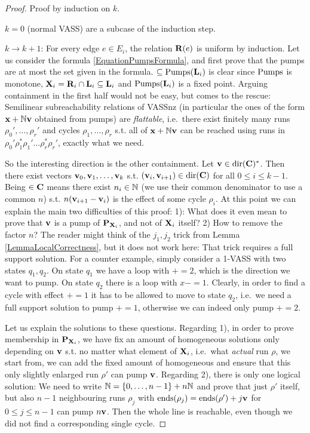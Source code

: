 \begin{proof}
Proof by induction on \(k\). 

\(k=0\) (normal VASS) are a subcase of the induction step.

\(k \to k+1\): For every edge \(e\in E_i\), the relation \(\mathbf{R}(e)\) is uniform by induction. Let us consider the formula \eqref{EquationPumpsFormula}, and first prove that the pumps are at most the set given in the formula. \(\subseteq \operatorname{Pumps}(\mathbf{L}_i)\) is clear since \(\operatorname{Pumps}\) is monotone, \(\mathbf{X}_i=\mathbf{R}_i \cap \mathbf{L}_i \subseteq \mathbf{L}_i\) and \(\operatorname{Pumps}(\mathbf{L}_i)\) is a fixed point. Arguing containment in the first half would not be easy, but \cite{Guttenberg24} comes to the rescue: Semilinear subreachability relations of VASSnz (in particular the ones of the form \(\mathbf{x}+\mathbb{N} \mathbf{v}\) obtained from pumps) are \emph{flattable}, i.e.\ there exist finitely many runs \(\rho_0', \dots, \rho_r'\) and cycles \(\rho_1, \dots, \rho_r\) s.t. all of \(\mathbf{x}+\mathbb{N} \mathbf{v}\) can be reached using runs in \(\rho_0' \rho_1^{\ast} \rho_1' \dots \rho_r^{\ast} \rho_r'\), exactly what we need.

So the interesting direction is the other containment. Let \(\mathbf{v} \in \operatorname{dir}(\mathbf{C})^{\ast}\). Then there exist vectors \(\mathbf{v}_0, \mathbf{v}_1, \dots, \mathbf{v}_k\) s.t. \((\mathbf{v}_i, \mathbf{v}_{i+1}) \in \operatorname{dir}(\mathbf{C})\) for all \(0 \leq i \leq k-1\). Being \(\in \mathbf{C}\) means there exist \(n_i \in \mathbb{N}\) (we use their common denominator to use a common \(n\)) s.t. \(n(\mathbf{v}_{i+1}- \mathbf{v}_i)\) is the effect of some cycle \(\rho_i\). At this point we can explain the main two difficulties of this proof: 1): What does it even mean to prove that \(\mathbf{v}\) is a pump of \(\mathbf{P}_{\mathbf{X}_i}\), and not of \(\mathbf{X}_i\) itself? 2) How to remove the factor \(n\)? The reader might think of the \(j_1, j_2\) trick from Lemma \ref{LemmaLocalCorrectness}, but it does not work here: That trick requires a full support solution. For a counter example, simply consider a 1-VASS with two states \(q_1, q_2\). On state \(q_1\) we have a loop with \(+=2\), which is the direction we want to pump. On state \(q_2\) there is a loop with \(x-=1\). Clearly, in order to find a cycle with effect \(+=1\) it has to be allowed to move to state \(q_2\), i.e.\ we need a full support solution to pump \(+=1\), otherwise we can indeed only pump \(+=2\).

Let us explain the solutions to these questions. Regarding 1), in order to prove membership in \(\mathbf{P}_{\mathbf{X}_i}\), we have fix an amount of homogeneous solutions only depending on \(\mathbf{v}\) s.t. no matter what element of \(\mathbf{X}_i\), i.e.\ what \emph{actual} run \(\rho\), we start from, we can add the fixed amount of homogeneous and ensure that this only slightly enlarged run \(\rho'\) can pump \(\mathbf{v}\). Regarding 2), there is only one logical solution: We need to write \(\mathbb{N}=\{0, \dots, n-1\}+n\mathbb{N}\) and prove that just \(\rho'\) itself, but also \(n-1\) neighbouring runs \(\rho_j\) with \(\operatorname{ends}(\rho_j)=\operatorname{ends}(\rho')+j \mathbf{v}\) for \(0 \leq j \leq n-1\) can pump \(n\mathbf{v}\). Then the whole line is reachable, even though we did not find a corresponding single cycle.


\end{proof}
